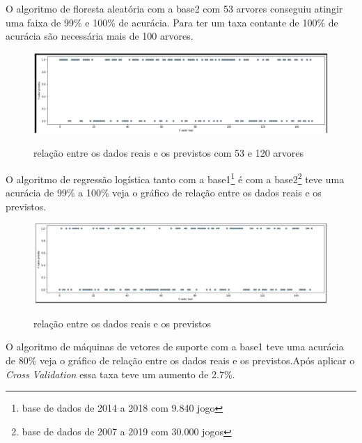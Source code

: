 O algoritmo de floresta aleatória com a base2 com 53 arvores conseguiu atingir uma faixa de 99\% e 100\% de acurácia. Para  ter um taxa contante de 100\% de acurácia são necessária mais de 100 arvores.
\begin{figure}[htbp]
	\begin{center}
		\includegraphics[width=1.2\linewidth]{imagens/florestaaleatoriaAPI.png}\\
	\end{center}
	\caption[relação entre os dados reais e os previstos com 53 e 120 arvores]{relação entre os dados reais e os previstos com 53 e 120 arvores}
	\label{fig:logo}
\end{figure}
\newpage
O algoritmo de regressão logística tanto com a base1\footnote[4]{base de dados de 2014 a 2018 com 9.840 jogo} é com a  base2\footnote[5]{base de dados de 2007 a 2019 com 30.000 jogos} teve uma acurácia de 99\% a 100\% veja o gráfico de relação entre os dados reais e os previstos.
\begin{figure}[htbp]
	\begin{center}
		\includegraphics[width=1.2\linewidth]{imagens/regressaologistocaAPI.png}\\
	\end{center}
	\caption[relação entre os dados reais e os previstos]{relação entre os dados reais e os previstos}
	\label{fig:logo}
\end{figure}

O algoritmo de máquinas de vetores de suporte com a base1 teve uma acurácia de 80\% veja o gráfico de relação entre os dados reais e os previstos.Após aplicar o \textit{Cross Validation} essa taxa teve um aumento de 2.7\%.

